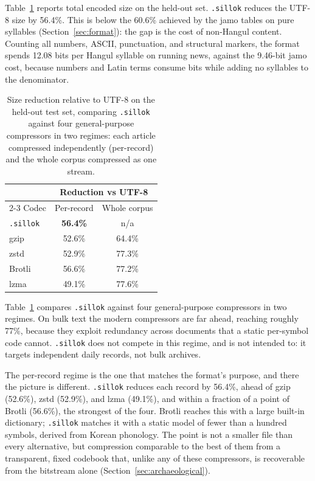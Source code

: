 \documentclass[conference]{IEEEtran}
\begin{document}
Table~\ref{tab:comp} reports total encoded size on the held-out set.
\texttt{.sillok} reduces the UTF-8 size by 56.4\%. This is below the 60.6\%
achieved by the jamo tables on pure syllables (Section~\ref{sec:format}): the
gap is the cost of non-Hangul content. Counting all numbers, ASCII, punctuation,
and structural markers, the format spends 12.08 bits per Hangul syllable on
running news, against the 9.46-bit jamo cost, because numbers and Latin terms
consume bits while adding no syllables to the denominator.

\begin{table}[H]
\centering
\caption{Size reduction relative to UTF-8 on the held-out test set, comparing
\texttt{.sillok} against four general-purpose compressors in two regimes:
each article compressed independently (per-record) and the whole corpus
compressed as one stream.}
\label{tab:comp}
\begin{tabular}{lcc}
\toprule
 & \multicolumn{2}{c}{Reduction vs UTF-8} \\
\cmidrule(l){2-3}
Codec & Per-record & Whole corpus \\
\midrule
\texttt{.sillok}      & \textbf{56.4\%} & n/a \\
gzip \cite{gzip}      & 52.6\% & 64.4\% \\
zstd \cite{zstd}      & 52.9\% & 77.3\% \\
Brotli \cite{brotli}  & 56.6\% & 77.2\% \\
lzma                  & 49.1\% & 77.6\% \\
\bottomrule
\end{tabular}
\end{table}

Table~\ref{tab:comp} compares \texttt{.sillok} against four general-purpose
compressors in two regimes. On bulk text the modern compressors are far ahead,
reaching roughly 77\%, because they exploit redundancy across documents that a
static per-symbol code cannot. \texttt{.sillok} does not compete in this regime,
and is not intended to: it targets independent daily records, not bulk archives.

The per-record regime is the one that matches the format's purpose, and there
the picture is different. \texttt{.sillok} reduces each record by 56.4\%, ahead
of gzip (52.6\%), zstd (52.9\%), and lzma (49.1\%), and within a fraction of a
point of Brotli (56.6\%), the strongest of the four. Brotli reaches this with a
large built-in dictionary; \texttt{.sillok} matches it with a static model of
fewer than a hundred symbols, derived from Korean phonology. The point is not a
smaller file than every alternative, but compression comparable to the best of
them from a transparent, fixed codebook that, unlike any of these compressors,
is recoverable from the bitstream alone (Section~\ref{sec:archaeological}).
\end{document}
